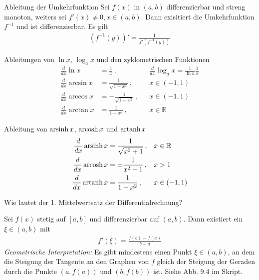 \begin{karte}{Ableitung der Umkehrfunktion}
	Sei \( f(x) \) in \((a,b)\) differenzierbar und streng monoton, weiters sei \(f'(x)\neq 0, x\in(a,b)\). Dann exisitiert die Umkehrfunktion \(f^{-1}\) und ist differenzierbar. Es gilt
	\begin{align}
		(f^{-1}(y))'=\frac{1}{f'(f^{-1}(y))}
	\end{align}
\end{karte}

\begin{karte}{Ableitungen von \(\ln{x}\), \(\log_{a}{x}\) und den zyklometrischen Funktionen}
	\begin{align}
		\frac{d}{dx}\ln{x}     & =\frac{1}{x}\, ,            &   & \frac{d}{dx}\log_a x = \frac{1}{\ln{a}}\frac{1}{x} \\
		\frac{d}{dx}\arcsin{x} & =\frac{1}{\sqrt{1-x^2}}\, , &   & x\in(-1,1)                                         \\
		\frac{d}{dx}\arccos{x} & =-\frac{1}{\sqrt{1-x^2}}\,, &   & x\in(-1,1)                                         \\
		\frac{d}{dx}\arctan{x} & =\frac{1}{1+x^2}\, ,        &   & x\in\mathbb{R}
	\end{align}
\end{karte}

\begin{karte}{Ableitung von \(\operatorname{arsinh}{x}\), \(\operatorname{arcosh}{x}\) und \(\operatorname{artanh}{x}\)}
	\begin{align}
		\frac{d}{dx}\operatorname{arsinh}{x} & =\frac{1}{\sqrt{x^2+1}}\, , & x & \in\mathbb{R} \\
		\frac{d}{dx}\operatorname{arcosh}{x} & =\pm\frac{1}{x^2-1}\, ,     & x & >1            \\
		\frac{d}{dx}\operatorname{artanh}{x} & =\frac{1}{1-x^2}\, ,        & x & \in(-1,1)
	\end{align}
\end{karte}

\begin{karte}{Wie lautet der 1. Mittelwertsatz der Differentialrechnung?}

	Sei \(f(x)\) stetig auf \([a,b]\) und differenzierbar auf \((a,b)\). Dann existiert ein \(\xi \in (a,b)\) mit
	\begin{align}
		f'(\xi)=\frac{f(b)-f(a)}{b-a}
	\end{align}
	{\large
		\emph{Geometrische Interpretation:} Es gibt mindestens einen Punkt \(\xi \in (a,b)\), an dem die Steigung der Tangente an den Graphen von $f$ gleich der Steigung der Geraden durch die Punkte \((a, f(a))\) und \((b, f(b))\) ist. Siehe Abb. 9.4 im Skript.
	}
\end{karte}



